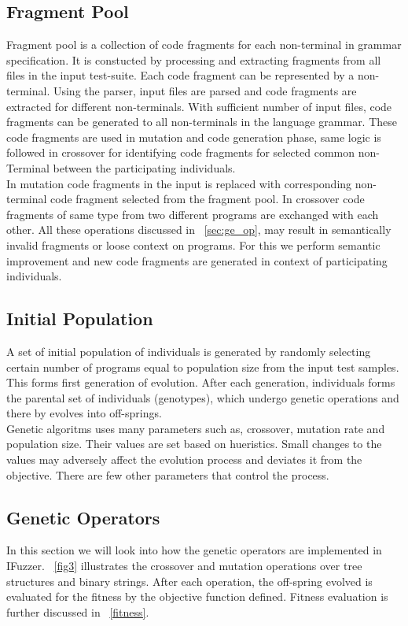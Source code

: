 \documentclass{acm_proc_article-sp}
\begin{document}
\subsection{Fragment Pool}
Fragment pool is a collection of code fragments for each non-terminal in grammar specification. It is constucted by processing and extracting fragments from all files in the input test-suite. Each code fragment can be represented by a non-terminal. Using the parser, input files are parsed and code fragments are extracted for different non-terminals. With sufficient number of input files, code fragments can be generated to all non-terminals in the language grammar. These code fragments are used in mutation and code generation phase, same logic is followed in crossover for identifying code fragments for selected common non-Terminal between the participating individuals. \\
\indent In mutation code fragments in the input is replaced with corresponding non-terminal code fragment selected from the fragment pool. In crossover code fragments of same type from two different programs are exchanged with each other. All these operations discussed in ~\autoref{sec:ge_op}, may result in  semantically invalid fragments or loose context on programs. For this we perform semantic improvement and new code fragments are generated in context of participating individuals.

\subsection{Initial Population}
A set of initial population of individuals is generated by randomly selecting certain number of programs equal to population size from the input test samples. This forms first generation of evolution. After each generation, individuals forms the parental set of individuals (genotypes), which undergo genetic operations and there by evolves into off-springs.\\
\indent Genetic algoritms uses many parameters such as, crossover, mutation rate and population size. Their values are set based on hueristics. Small changes to the values may adversely affect the evolution process and deviates it from the objective. There are few other parameters that control the process. 

\subsection{Genetic Operators} \label{sec:ge_op}
In this section we will look into how the genetic operators are implemented in IFuzzer. ~\autoref{fig3} illustrates the crossover and mutation operations over tree structures and binary strings. After each operation, the off-spring evolved is evaluated for the fitness by the objective function defined. Fitness evaluation is further discussed in ~\autoref{fitness}.
\end{document}
